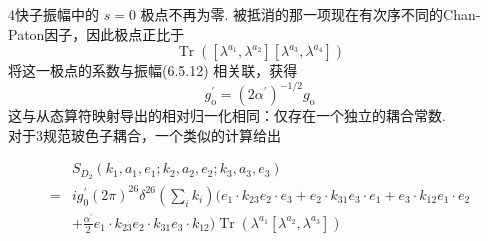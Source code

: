4快子振幅中的 $s=0$ 极点不再为零. 被抵消的那一项现在有次序不同的Chan-Paton因子，因此极点正比于
\begin{equation}
	\operatorname{Tr}\left(\left[\lambda^{a_{1}}, \lambda^{a_{2}}\right]\left[\lambda^{a_{3}}, \lambda^{a_{4}}\right]\right)
\end{equation}
将这一极点的系数与振幅(6.5.12) 相关联，获得
\begin{equation}
	g_{\mathrm{o}}^{\prime}=\left(2 \alpha^{\prime}\right)^{-1 / 2} g_{\mathrm{o}}
\end{equation}
这与从态算符映射导出的相对归一化相同：仅存在一个独立的耦合常数. \\
对于3规范玻色子耦合，一个类似的计算给出

\begin{equation}
	\begin{aligned}
		&S_{D_{2}}(k_{1}, a_{1}, e_{1} ; k_{2}, a_{2}, e_{2} ; k_{3}, a_{3}, e_{3}) \\
		=&i g_{0}^{\prime}(2 \pi)^{26} \delta^{26}(\sum_{i} k_{i})(e_{1} \cdot k_{23} e_{2} \cdot e_{3}+e_{2} \cdot k_{31} e_{3} \cdot e_{1}+e_{3} \cdot k_{12} e_{1} \cdot e_{2} \\
		&+\frac{\alpha^{\prime}}{2} e_{1} \cdot k_{23} e_{2} \cdot k_{31} e_{3} \cdot k_{12}) \operatorname{Tr}(\lambda^{a_{1}}[\lambda^{a_{2}}, \lambda^{a_{3}}])
	\end{aligned}
\end{equation}

